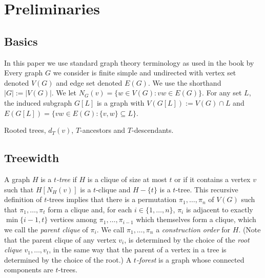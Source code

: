 \documentclass[kpfonts]{patmorin}
\newcommand{\uqs}{\chi_2}
\newcommand{\hus}{\hat{\chi}_2}
\theoremstyle{named}
\begin{document}
%
%
%

\section{Preliminaries}

\subsection{Basics}

In this paper we use standard graph theory terminology as used in the book by \citet{diestel:graph}
Every graph $G$ we consider is finite simple and undirected with vertex set denoted $V(G)$ and edge set denoted $E(G)$.  We use the shorthand $|G|:=|V(G)|$.
We let $N_G(v)=\{w\in V(G): vw\in E(G)\}$.
For any set $L$, the induced subgraph  $G[L]$ is a graph with $V(G[L]):=V(G)\cap L$ and $E(G[L])=\{vw\in E(G): \{v,w\}\subseteq L\}$.

Rooted trees, $d_T(v)$, $T$-ancestors and $T$-descendants.

\subsection{Treewidth}

A graph $H$ is a \emph{$t$-tree} if $H$ is a clique of size at most $t$ or if it contains a vertex $v$ such that $H[N_H(v)]$ is a $t$-clique and $H-\{t\}$ is a $t$-tree.  This recursive definition of $t$-trees implies that there is a permutation $\pi_1,\ldots,\pi_n$ of $V(G)$ such that $\pi_1,\ldots,\pi_t$ form a clique and, for each $i\in\{1,\ldots,n\}$, $\pi_i$ is adjacent to exactly $\min\{i-1,t\}$ vertices among $\pi_1,\ldots,\pi_{i-1}$ which themselves form a clique, which we call the \emph{parent clique} of $\pi_i$.  We call $\pi_1,\ldots,\pi_n$ a \emph{construction order} for $H$.  (Note that the parent clique of any vertex $v_i$, is determined by the choice of the \emph{root clique} $v_1,\ldots,v_t$, in the same way that the parent of a vertex in a tree is determined by the choice of the root.)  A \emph{$t$-forest} is a graph whose connected components are $t$-trees.
\end{document}
